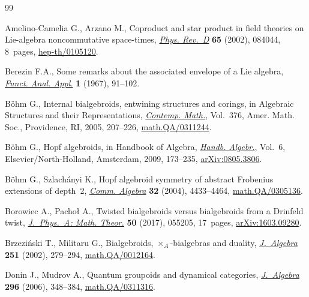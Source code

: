 \documentclass[10pt,a4paper]{amsart}
\numberwithin{equation}{section}
\begin{document}

\begin{thebibliography}{99}
\footnotesize\itemsep=0pt

Amelino-Camelia G., Arzano M., Coproduct and star product in field theories on
 {L}ie-algebra noncommutative space-times, \href{https://doi.org/10.1103/PhysRevD.65.084044}{\textit{Phys. Rev.~D}} \textbf{65}
 (2002), 084044, 8~pages, \href{https://arxiv.org/abs/hep-th/0105120}{hep-th/0105120}.

Berezin F.A., Some remarks about the associated envelope of a {L}ie algebra,
 \href{https://doi.org/10.1007/BF01076082}{\textit{Funct. Anal. Appl.}} \textbf{1} (1967), 91--102.

B\"ohm G., Internal bialgebroids, entwining structures and corings, in
 Algebraic Structures and their Representations, \href{https://doi.org/10.1090/conm/376/06959}{\textit{Contemp. Math.}}, Vol.~376, Amer. Math. Soc., Providence, RI, 2005, 207--226, \href{https://arxiv.org/abs/math.QA/0311244}{math.QA/0311244}.

B\"ohm G., Hopf algebroids, in Handbook of Algebra, \href{https://doi.org/10.1016/S1570-7954(08)00205-2}{\textit{Handb.
 Algebr.}}, Vol.~6, Elsevier/North-Holland, Amsterdam, 2009, 173--235,
 \href{https://arxiv.org/abs/0805.3806}{arXiv:0805.3806}.

B\"ohm G., Szlach\'anyi K., Hopf algebroid symmetry of abstract {F}robenius
 extensions of depth~2, \href{https://doi.org/10.1081/AGB-200034171}{\textit{Comm. Algebra}} \textbf{32} (2004), 4433--4464,
 \href{https://arxiv.org/abs/math.QA/0305136}{math.QA/0305136}.

Borowiec A., Pacho{\l} A., Twisted bialgebroids versus bialgebroids from a
 {D}rinfeld twist, \href{https://doi.org/10.1088/1751-8121/50/5/055205}{\textit{J.~Phys.~A: Math. Theor.}} \textbf{50} (2017),
 055205, 17~pages, \href{https://arxiv.org/abs/1603.09280}{arXiv:1603.09280}.

Brzezi\'nski T., Militaru G., Bialgebroids, {$\times_A$}-bialgebras and
 duality, \href{https://doi.org/10.1006/jabr.2001.9101}{\textit{J.~Algebra}} \textbf{251} (2002), 279--294,
 \href{https://arxiv.org/abs/math.QA/0012164}{math.QA/0012164}.

Donin J., Mudrov A., Quantum groupoids and dynamical categories,
 \href{https://doi.org/10.1016/j.jalgebra.2006.01.001}{\textit{J.~Algebra}} \textbf{296} (2006), 348--384, \href{https://arxiv.org/abs/math.QA/0311316}{math.QA/0311316}.


\end{thebibliography}
\end{document}
